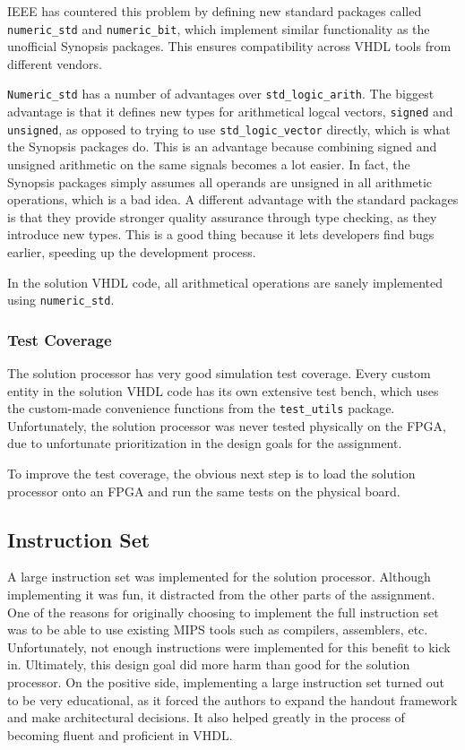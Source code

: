 IEEE has countered this problem by defining new standard packages called \texttt{numeric\_std} and \texttt{numeric\_bit}, which implement similar functionality as the unofficial Synopsis packages.
This ensures compatibility across VHDL tools from different vendors.

\texttt{Numeric\_std} has a number of advantages over \texttt{std\_logic\_arith}.
The biggest advantage is that it defines new types for arithmetical logcal vectors, \texttt{signed} and \texttt{unsigned}, as opposed to trying to use \texttt{std\_logic\_vector} directly, which is what the Synopsis packages do.
This is an advantage because combining signed and unsigned arithmetic on the same signals becomes a lot easier.
In fact, the Synopsis packages simply assumes all operands are unsigned in all arithmetic operations, which is a bad idea.
A different advantage with the standard packages is that they provide stronger quality assurance through type checking, as they introduce new types.
This is a good thing because it lets developers find bugs earlier, speeding up the development process.

In the solution VHDL code, all arithmetical operations are sanely implemented using \texttt{numeric\_std}.

\subsubsection{Test Coverage}

The solution processor has very good simulation test coverage.
Every custom entity in the solution VHDL code has its own extensive test bench, which uses the custom-made convenience functions from the \texttt{test\_utils} package.
Unfortunately, the solution processor was never tested physically on the FPGA, due to unfortunate prioritization in the design goals for the assignment.

To improve the test coverage, the obvious next step is to load the solution processor onto an FPGA and run the same tests on the physical board.

\subsection{Instruction Set}

A large instruction set was implemented for the solution processor.
Although implementing it was fun, it distracted from the other parts of the assignment.
One of the reasons for originally choosing to implement the full instruction set was to be able to use existing MIPS tools such as compilers, assemblers, etc.
Unfortunately, not enough instructions were implemented for this benefit to kick in.
Ultimately, this design goal did more harm than good for the solution processor.
On the positive side, implementing a large instruction set turned out to be very educational, as it forced the authors to expand the handout framework and make architectural decisions.
It also helped greatly in the process of becoming fluent and proficient in VHDL.

